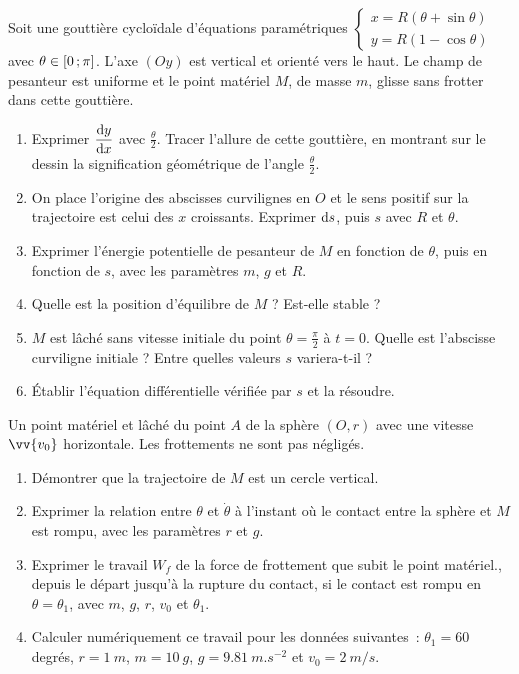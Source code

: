 \begin{exercice}
  Soit une gouttière cycloïdale d'équations paramétriques \(\begin{cases} x = R(\theta +\sin\theta) \\ y=R(1-\cos\theta)\end{cases}\) avec \(\theta \in \left[ 0 \, ;  \pi \right]\). L'axe \((Oy)\) est vertical et orienté vers le haut. Le champ de pesanteur est uniforme et le point matériel \(M\), de masse \(m\), glisse sans frotter dans cette gouttière.
  \begin{enumerate}
  \item Exprimer \(\dfrac{\mathrm{d} y}{\mathrm{d} x}\) avec \(\frac{\theta}{2}\). Tracer l'allure de cette gouttière, en montrant sur le dessin la signification géométrique de l'angle \(\frac{\theta}{2}\).
  \item On place l'origine des abscisses curvilignes en \(O\) et le sens positif sur la trajectoire est celui des \(x\) croissants. Exprimer \(\mathrm{d} s\), puis \(s\) avec \(R\) et \(\theta\).
  \item Exprimer l'énergie potentielle de pesanteur de \(M\) en fonction de \(\theta\), puis en fonction de \(s\), avec les paramètres \(m\), \(g\) et \(R\).
  \item Quelle est la position d'équilibre de \(M\) ? Est-elle stable ?
  \item \(M\) est lâché sans vitesse initiale du point \(\theta=\frac{\pi}{2}\) à \(t=0\). Quelle est l'abscisse curviligne initiale ? Entre quelles valeurs \(s\) variera-t-il ?
  \item Établir l'équation différentielle vérifiée par \(s\) et la résoudre.
 \end{enumerate}
\end{exercice}
%
\begin{exercice}
  Un point matériel et lâché du point \(A\) de la sphère \((O, r)\) avec une vitesse \(\vv{v_0}\) horizontale. Les frottements ne sont pas négligés.
  \begin{enumerate}
  \item Démontrer que la trajectoire de \(M\) est un cercle vertical.
  \item Exprimer la relation entre \(\theta\) et \(\dot{\theta}\) à l'instant où le contact entre la sphère et \(M\) est rompu, avec les paramètres \(r\) et \(g\).
  \item Exprimer le travail \(W_f\) de la force de frottement que subit le point matériel., depuis le départ jusqu'à la rupture du contact, si le contact est rompu en \(\theta=\theta_1\), avec \(m\), \(g\), \(r\), \(v_0\) et \(\theta_1\).
  \item Calculer numériquement ce travail pour les données suivantes~: \(\theta_1=60\) degrés, \(r=\SI{1}{m}\), \(m=\SI{10}{g}\), \(g=\SI{9,81}{m.s^{-2}}\) et \(v_0=\SI{2}{m/s}\).
  \end{enumerate}
\end{exercice}
